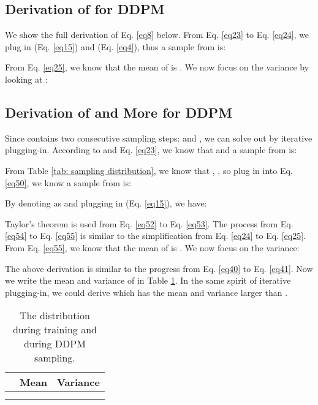 \documentclass{article} \usepackage{iclr2024_conference,times}
\begin{document}
\subsection{Derivation of \texorpdfstring{}{Lg} for DDPM}
\label{Append:1}

We show the full derivation of Eq. \ref{eq8} below. From Eq. \ref{eq23} to Eq. \ref{eq24}, we plug in  (Eq. \ref{eq15}) and  (Eq. \ref{eq4}), thus a sample from  is:



\noindent
From Eq. \ref{eq25}, we know that the mean of  is . We now focus on the variance by looking at :





\subsection{Derivation of \texorpdfstring{}{Lg} and More for DDPM}
\label{Append:1.1}
Since  contains two consecutive sampling steps:  and , we can solve out  by iterative plugging-in. According to  and Eq. \ref{eq23}, we know that  and a sample from  is:



\noindent
From Table \ref{tab: sampling distribution}, we know that , , so plug in  into Eq. \ref{eq50}, we know a sample from  is:


\noindent
By denoting  as  and plugging in  (Eq. \ref{eq15}), we have:



\noindent
Taylor's theorem is used from Eq. \ref{eq52} to Eq. \ref{eq53}. The process from Eq. \ref{eq54} to Eq. \ref{eq55} is similar to the simplification from Eq. \ref{eq24} to Eq. \ref{eq25}. From Eq. \ref{eq55}, we know that the mean of  is . We now focus on the variance:

The above derivation is similar to the progress from Eq. \ref{eq40} to Eq. \ref{eq41}. Now we write the mean and variance of  in Table \ref{tab: two-step sampling distribution}. In the same spirit of iterative plugging-in, we could derive  which has the mean  and variance larger than . 

\begin{table}[ht]
\vskip -0.0in
\captionsetup{skip=2pt}
\caption{
The distribution  during training and  during DDPM sampling.}
\label{tab: two-step sampling distribution}
\begin{center}
\begin{tabular}{@{}lll@{}}
\toprule
 & Mean & Variance \\ \midrule
 &  &  \\
  &  &  \\ \bottomrule
\end{tabular}
\end{center}
\vskip -0.1in
\end{table}
\end{document}
